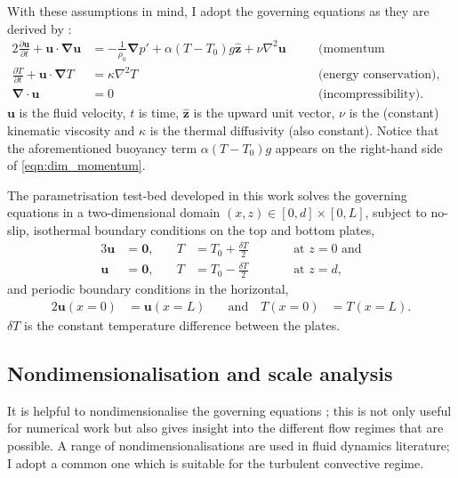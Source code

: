 \documentclass[titlepage,twoside]{article}
\numberwithin{equation}{section}
\newcommand{\pdiff}[2]{\frac{\partial #1}{\partial #2}}
\renewcommand\vec{\bm}
\newcommand{\uvec}[1]{\vec{\hat{#1}}}
\newcommand{\grad}{\vec{\nabla}}
\begin{document}
With these assumptions in mind, I adopt the governing equations as they
are derived by \textcite{chandrasekhar1961}:
\begin{alignat}{2}
    \label{eqn:dim_momentum}
    \pdiff{\vec{u}}{t} + \vec{u} \cdot \grad \vec{u}
        &= -\frac{1}{\rho_0} \grad p' + \alpha (T - T_0) g \uvec{z}
        + \nu \nabla^2 \vec{u}
    &\quad& \text{(momentum conservation),} \\
    \label{eqn:dim_energy}
    \pdiff{T}{t} + \vec{u} \cdot \grad T
        &= \kappa \nabla^2 T
    && \text{(energy conservation), and} \\
    \label{eqn:dim_incompressible}
    \grad \cdot \vec{u} &= 0
    && \text{(incompressibility).}
\end{alignat}
$\vec{u}$ is the fluid velocity, $t$ is time, $\uvec{z}$ is the upward
unit vector, $\nu$ is the (constant) kinematic viscosity and $\kappa$ is
the thermal diffusivity (also constant). Notice that the aforementioned
buoyancy term $\alpha (T - T_0) g$ appears on the right-hand side of
\cref{eqn:dim_momentum}.

The parametrisation test-bed developed in this work solves the governing
equations in a two-dimensional domain $(x,z) \in [0, d] \times [0, L]$, subject
to no-slip, isothermal boundary conditions on the top and bottom plates,
\begin{alignat}{3}
    \label{eqn:dim_bc_bot}
    \vec{u} &= \vec{0}, &\quad T &= T_0 + \frac{\delta T}{2}
    &\qquad& \text{at } z = 0 \text{ and} \\
    \label{eqn:dim_bc_top}
    \vec{u} &= \vec{0}, &\quad T &= T_0 - \frac{\delta T}{2}
    &\qquad& \text{at } z = d,
\end{alignat}
and periodic boundary conditions in the horizontal,
\begin{alignat}{2}
    \label{eqn:dim_bc_sides}
    \vec{u}(x=0) &= \vec{u}(x=L) &\quad \text{and} \quad T(x=0) &= T(x=L).
\end{alignat}
$\delta T$ is the constant temperature difference between the plates.

\subsection{Nondimensionalisation and scale analysis}
It is helpful to nondimensionalise the governing equations
; this is not only useful for
numerical work but also gives insight into the different flow regimes that are
possible. A range of nondimensionalisations are used in fluid dynamics
literature; I adopt a common one \parencite[see,
e.g.,][]{grotzbach1983,ouertatani2008,stevens2010} which is suitable for the
turbulent convective regime.
\end{document}
